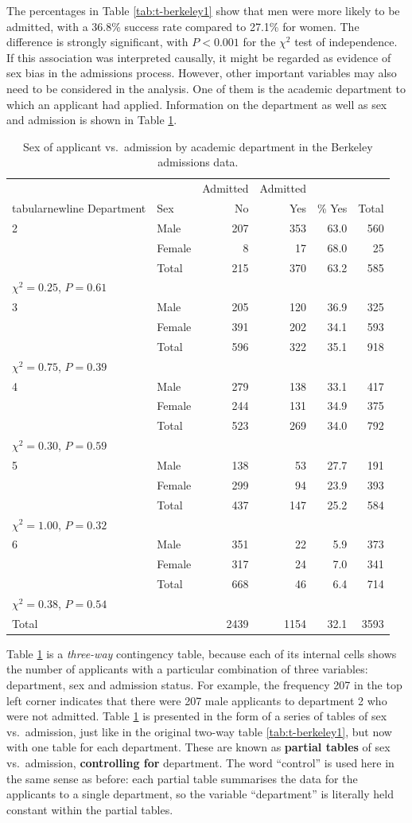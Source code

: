 \documentclass[11pt,a4paper,openany]{book}
\begin{document}
The percentages in Table \ref{tab:t-berkeley1} show that men were more
likely to be admitted, with a 36.8\% success rate compared to 27.1\% for
women. The difference is strongly significant, with \(P<0.001\) for the
\(\chi^{2}\) test of independence. If this association was interpreted
causally, it might be regarded as evidence of sex bias in the admissions
process. However, other important variables may also need to be
considered in the analysis. One of them is the academic department to
which an applicant had applied. Information on the department as well as
sex and admission is shown in Table \ref{tab:t-berkeley2}.

\begin{longtable}[]{@{}llrrrr@{}}
\caption{\label{tab:t-berkeley2} Sex of applicant vs.~admission by academic
department in the Berkeley admissions data.}\tabularnewline
\toprule
\ & \ & Admitted & Admitted & \ & \\tabularnewline
Department & Sex & No & Yes & \% Yes & Total\tabularnewline
2 & Male & 207 & 353 & 63.0 & 560\tabularnewline
& Female & 8 & 17 & 68.0 & 25\tabularnewline
& Total & 215 & 370 & 63.2 & 585\tabularnewline
\(\chi^{2}=0.25\), \(P=0.61\) & & & & &\tabularnewline
3 & Male & 205 & 120 & 36.9 & 325\tabularnewline
& Female & 391 & 202 & 34.1 & 593\tabularnewline
& Total & 596 & 322 & 35.1 & 918\tabularnewline
\(\chi^{2}=0.75\), \(P=0.39\) & & & & &\tabularnewline
4 & Male & 279 & 138 & 33.1 & 417\tabularnewline
& Female & 244 & 131 & 34.9 & 375\tabularnewline
& Total & 523 & 269 & 34.0 & 792\tabularnewline
\(\chi^{2}=0.30\), \(P=0.59\) & & & & &\tabularnewline
5 & Male & 138 & 53 & 27.7 & 191\tabularnewline
& Female & 299 & 94 & 23.9 & 393\tabularnewline
& Total & 437 & 147 & 25.2 & 584\tabularnewline
\(\chi^{2}=1.00\), \(P=0.32\) & & & & &\tabularnewline
6 & Male & 351 & 22 & 5.9 & 373\tabularnewline
& Female & 317 & 24 & 7.0 & 341\tabularnewline
& Total & 668 & 46 & 6.4 & 714\tabularnewline
\(\chi^{2}=0.38\), \(P=0.54\) & & & & &\tabularnewline
Total & & 2439 & 1154 & 32.1 & 3593\tabularnewline
\bottomrule
\end{longtable}

Table \ref{tab:t-berkeley2} is a \emph{three-way} contingency table,
because each of its internal cells shows the number of applicants with a
particular combination of three variables: department, sex and admission
status. For example, the frequency 207 in the top left corner indicates
that there were 207 male applicants to department 2 who were not
admitted. Table \ref{tab:t-berkeley2} is presented in the form of a
series of tables of sex vs.~admission, just like in the original two-way
table \ref{tab:t-berkeley1}, but now with one table for each department.
These are known as \textbf{partial tables} of sex vs.~admission,
\textbf{controlling for} department. The word ``control'' is used here
in the same sense as before: each partial table summarises the data for
the applicants to a single department, so the variable ``department'' is
literally held constant within the partial tables.
\end{document}
